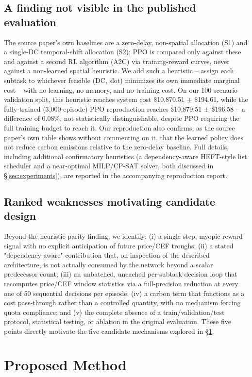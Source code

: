 \documentclass[journal]{IEEEtran}
\begin{document}
\subsection{A finding not visible in the published evaluation}
The source paper's own baselines are a zero-delay, non-spatial allocation (S1) and a single-DC temporal-shift allocation (S2); PPO is compared only against these and against a second RL algorithm (A2C) via training-reward curves, never against a non-learned spatial heuristic. We add such a heuristic -- assign each subtask to whichever feasible (DC, slot) minimizes its own immediate marginal cost -- with no learning, no memory, and no training cost. On our 100-scenario validation split, this heuristic reaches system cost \$10{,}870.51 $\pm$ \$194.61, while the fully-trained (3{,}000-episode) PPO reproduction reaches \$10{,}879.51 $\pm$ \$196.58 -- a difference of 0.08\%, not statistically distinguishable, despite PPO requiring the full training budget to reach it. Our reproduction also confirms, as the source paper's own table shows without commenting on it, that the learned policy does not reduce carbon emissions relative to the zero-delay baseline. Full details, including additional confirmatory heuristics (a dependency-aware HEFT-style list scheduler and a near-optimal MILP/CP-SAT solver, both discussed in \S\ref{sec:experiments}), are reported in the accompanying reproduction report.

\subsection{Ranked weaknesses motivating candidate design}
Beyond the heuristic-parity finding, we identify: (i) a single-step, myopic reward signal with no explicit anticipation of future price/CEF troughs; (ii) a stated "dependency-aware" contribution that, on inspection of the described architecture, is not actually consumed by the network beyond a scalar predecessor count; (iii) an unbatched, uncached per-subtask decision loop that recomputes price/CEF window statistics via a full-precision reduction at every one of 50 sequential decisions per episode; (iv) a carbon term that functions as a cost pass-through rather than a controlled quantity, with no mechanism forcing quota compliance; and (v) the complete absence of a train/validation/test protocol, statistical testing, or ablation in the original evaluation. These five points directly motivate the five candidate mechanisms explored in \S\ref{sec:method}.

\section{Proposed Method}
\label{sec:method}
\end{document}

